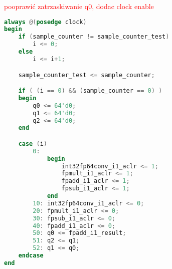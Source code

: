 \textcolor{red}{pooprawić zatrzaskiwanie q0, dodac clock enable}
\begin{lstlisting}[language=verilog,caption={Algorytm Goertzla -- pętla},label={lst:loop}]
always @(posedge clock)
begin
	if (sample_counter != sample_counter_test)
		i <= 0;
	else
		i <= i+1;

	sample_counter_test <= sample_counter;

	if ( (i == 0) && (sample_counter == 0) )
	begin
		q0 <= 64'd0;
		q1 <= 64'd0;
		q2 <= 64'd0;
	end

	case (i)
		0:
			begin
				int32fp64conv_i1_aclr <= 1;
				fpmult_i1_aclr <= 1;
				fpadd_i1_aclr <= 1;
				fpsub_i1_aclr <= 1;
			end
		10: int32fp64conv_i1_aclr <= 0;
		20:	fpmult_i1_aclr <= 0;
		30: fpsub_i1_aclr <= 0;
		40: fpadd_i1_aclr <= 0;
		50: q0 <= fpadd_i1_result;
		51: q2 <= q1;
		52: q1 <= q0;
	endcase
end
\end{lstlisting}
\vspace{10pt}

